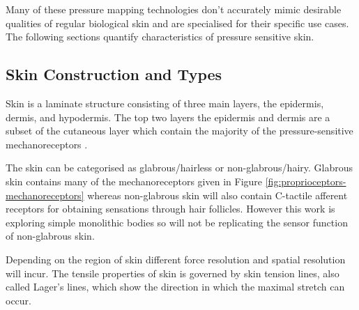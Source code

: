 Many of these pressure mapping technologies don't accurately mimic desirable qualities of regular biological skin and are specialised for their specific use cases. The following sections quantify characteristics of pressure sensitive skin.

\subsection{Skin Construction and Types}
Skin is a laminate structure consisting of three main layers, the epidermis, dermis, and hypodermis. The top two layers the epidermis and dermis are a subset of the cutaneous layer which contain the majority of the pressure-sensitive mechanoreceptors \cite{}.

The skin can be categorised as glabrous/hairless or non-glabrous/hairy. Glabrous skin contains many of the mechanoreceptors given in Figure \ref{fig:proprioceptors-mechanoreceptors} whereas non-glabrous skin will also contain C-tactile afferent receptors for obtaining sensations through hair follicles. However this work is exploring simple monolithic bodies so will not be replicating the sensor function of non-glabrous skin.

Depending on the region of skin different force resolution and spatial resolution will incur. The tensile properties of skin is governed by skin tension lines, also called Lager's lines, which show the direction in which the maximal stretch can occur. 

